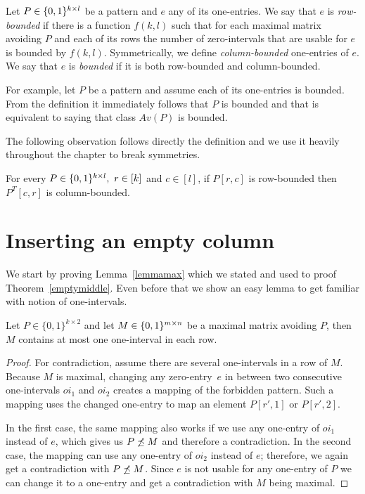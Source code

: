 \begin{defn}
Let $P\in\{0,1\}^{k\times l}$ be a pattern and $e$ any of its one-entries. We say that $e$ is \emph{row-bounded} if there is a function $f(k,l)$ such that for each maximal matrix avoiding $P$ and each of its rows the number of zero-intervals that are usable for $e$ is bounded by $f(k,l)$. Symmetrically, we define \emph{column-bounded} one-entries of $e$. We say that $e$ is \emph{bounded} if it is both row-bounded and column-bounded.
\end{defn}

For example, let $P$ be a pattern and assume each of its one-entries is bounded. From the definition it immediately follows that $P$ is bounded and that is equivalent to saying that class $Av(P)$ is bounded.

The following observation follows directly the definition and we use it heavily throughout the chapter to break symmetries.

\begin{obs}
For every $P\in\{0,1\}^{k\times l},\ r\in[k]$ and $c\in[l]$, if $P[r,c]$ is row-bounded then $P^T[c,r]$ is column-bounded.
\end{obs}

\section{Inserting an empty column}
We start by proving Lemma~\ref{lemmamax} which we stated and used to proof Theorem~\ref{emptymiddle}. Even before that we show an easy lemma to get familiar with notion of one-intervals.

\begin{lemma}
\label{twocols}
Let $P\in\{0,1\}^{k\times2}$ and let $M\in\{0,1\}^{m\times n}$ be a maximal matrix avoiding $P$, then $M$ contains at most one one-interval in each row.
\end{lemma}
\begin{proof}
For contradiction, assume there are several one-intervals in a row of $M$. Because $M$ is maximal, changing any zero-entry~$e$ in between two consecutive one-intervals $oi_1$ and $oi_2$ creates a mapping of the forbidden pattern. Such a mapping uses the changed one-entry to map an element $P[r',1]$ or $P[r',2]$.

In the first case, the same mapping also works if we use any one-entry of $oi_1$ instead of $e$, which gives us $P\not\preceq M$ and therefore a contradiction. In the second case, the mapping can use any one-entry of $oi_2$ instead of $e$; therefore, we again get a contradiction with $P\not\preceq M$. Since $e$ is not usable for any one-entry of $P$ we can change it to a one-entry and get a contradiction with $M$ being maximal.
\end{proof}

